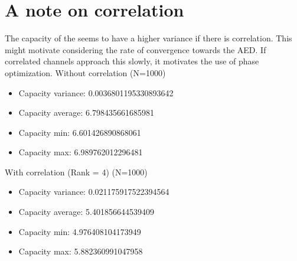 \documentclass[12pt,a4paper]{report}
\begin{document}
\section{A note on correlation}
The capacity of the seems to have a higher variance if there is correlation.
This might motivate considering the rate of convergence towards the AED. If correlated channels approach this slowly, it motivates the use of phase optimization. 
Without correlation (N=1000)
\begin{itemize}
\item
Capacity variance:
 0.0036801195330893642
 \item
Capacity average:
 6.798435661685981
 \item
Capacity min:
 6.601426890868061
\item
Capacity max:
 6.989762012296481
\end{itemize}

With correlation (Rank = 4) (N=1000)
\begin{itemize}
\item
Capacity variance:
 0.021175917522394564
 \item
Capacity average:
 5.401856644539409
 \item
Capacity min:
 4.976408104173949
 \item
Capacity max:
 5.882360991047958
\end{itemize}


\end{document}
